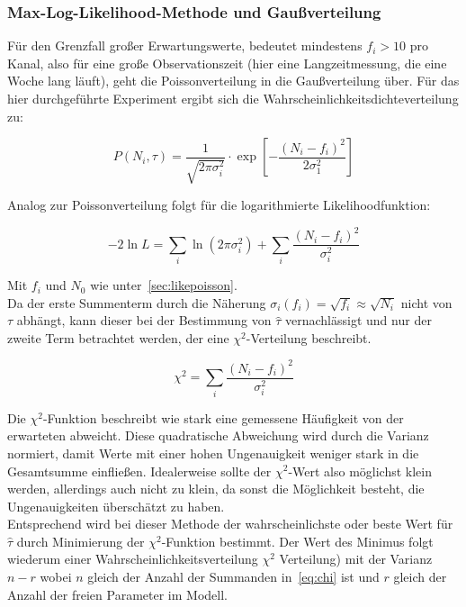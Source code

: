 \documentclass[slug=LM, room=Andreas-Schubert-Bau\,\ K\ 1A, supervisor=Anne-Sophie\ Berthold, coursedate=13.\ 12.\ 2019]{../../Lab_Report_LaTeX/lab_report}
\begin{document}
\subsubsection{Max-Log-Likelihood-Methode und Gaußverteilung}
\label{sec:likegauss}

Für den Grenzfall großer Erwartungswerte, bedeutet mindestens \(f_i > 10\) pro Kanal, also für
eine große Observationszeit (hier eine Langzeitmessung, die eine Woche lang läuft), geht die
Poissonverteilung in die Gaußverteilung über. Für das hier durchgeführte Experiment ergibt sich
die Wahrscheinlichkeitsdichteverteilung zu:

\begin{equation}\label{eq:wahrgauss}
 P(N_i,\tau) = \frac{1}{\sqrt{2\pi \sigma_i^2}} \cdot \exp[-\frac{(N_i-f_i)^2}{2\sigma_1^2}]
\end{equation}

Analog zur Poissonverteilung folgt für die logarithmierte Likelihoodfunktion:

\begin{equation}\label{key}
 -2\ln L = \sum_{i}\ln (2\pi\sigma_i^2) + \sum_{i} \frac{(N_i - f_i)^2}{\sigma_i^2}
\end{equation}

Mit \(f_i\) und \(N_0\) wie unter~\ref{sec:likepoisson}. \\

Da der erste Summenterm durch die Näherung \(\sigma_i(f_i) = \sqrt{f_i} \approx \sqrt{N_i}\) nicht
von \(\tau\) abhängt, kann dieser bei der Bestimmung von \(\hat{\tau}\) vernachlässigt und nur
der zweite Term betrachtet werden, der eine \(\chi^2\)-Verteilung beschreibt.

\begin{equation}\label{eq:chi}
 \chi^2 = \sum_{i} \frac{(N_i - f_i)^2}{\sigma_i^2}
\end{equation}

Die \(\chi^2\)-Funktion beschreibt wie stark eine gemessene Häufigkeit von der erwarteten abweicht.
Diese quadratische Abweichung wird durch die Varianz normiert, damit Werte mit einer hohen
Ungenauigkeit weniger stark in die Gesamtsumme einfließen. Idealerweise sollte der \(\chi^2\)-Wert
also möglichst klein werden, allerdings auch nicht zu klein, da sonst die Möglichkeit besteht, die
Ungenauigkeiten überschätzt zu haben.\\

Entsprechend wird bei dieser Methode der wahrscheinlichste oder beste Wert für \(\hat\tau\) durch
Minimierung der \(\chi^2\)-Funktion bestimmt. Der Wert des Minimus
folgt wiederum einer Wahrscheinlichkeitsverteilung \(\chi^2\)
Verteilung) mit der Varianz \(n-r\) wobei \(n\) gleich der Anzahl der
Summanden in~\ref{eq:chi} ist und \(r\) gleich der Anzahl der freien
Parameter im Modell.
\end{document}
